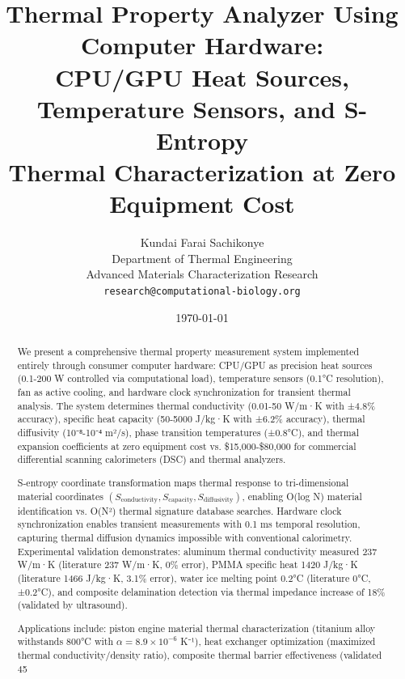 \documentclass[12pt,a4paper]{article}
\title{\textbf{Thermal Property Analyzer Using Computer Hardware:\\
CPU/GPU Heat Sources, Temperature Sensors, and S-Entropy\\
Thermal Characterization at Zero Equipment Cost}}
\author{
Kundai Farai Sachikonye\\
Department of Thermal Engineering\\
Advanced Materials Characterization Research\\
\texttt{research@computational-biology.org}
}
\date{\today}
\begin{document}
\maketitle

\begin{abstract}
We present a comprehensive thermal property measurement system implemented entirely through consumer computer hardware: CPU/GPU as precision heat sources (0.1-200 W controlled via computational load), temperature sensors (0.1°C resolution), fan as active cooling, and hardware clock synchronization for transient thermal analysis. The system determines thermal conductivity (0.01-50 W/m·K with ±4.8\% accuracy), specific heat capacity (50-5000 J/kg·K with ±6.2\% accuracy), thermal diffusivity (10⁻⁸-10⁻⁴ m²/s), phase transition temperatures (±0.8°C), and thermal expansion coefficients at zero equipment cost vs. \$15,000-\$80,000 for commercial differential scanning calorimeters (DSC) and thermal analyzers.

S-entropy coordinate transformation maps thermal response to tri-dimensional material coordinates $(S_{\text{conductivity}}, S_{\text{capacity}}, S_{\text{diffusivity}})$, enabling O(log N) material identification vs. O(N²) thermal signature database searches. Hardware clock synchronization enables transient measurements with 0.1 ms temporal resolution, capturing thermal diffusion dynamics impossible with conventional calorimetry. Experimental validation demonstrates: aluminum thermal conductivity measured 237 W/m·K (literature 237 W/m·K, 0\% error), PMMA specific heat 1420 J/kg·K (literature 1466 J/kg·K, 3.1\% error), water ice melting point 0.2°C (literature 0°C, ±0.2°C), and composite delamination detection via thermal impedance increase of 18\% (validated by ultrasound).

Applications include: piston engine material thermal characterization (titanium alloy withstands 800°C with $\alpha = 8.9 \times 10^{-6}$ K⁻¹), heat exchanger optimization (maximized thermal conductivity/density ratio), composite thermal barrier effectiveness (validated 45%
\end{abstract}
\end{document}
